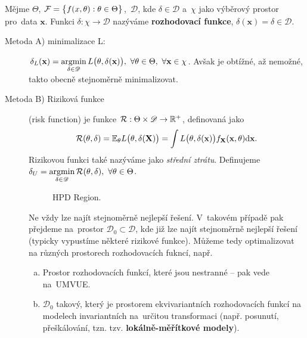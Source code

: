 \begin{define}
	Mějme $\Theta$, $\mathcal{F}=\big\{ f(x,\theta):\theta\in\Theta \big\}$,~$\mathscr{D}$, kde $\delta\in\mathscr{D}$ a~$\chi$ jako výběrový prostor pro~data $\textbf{x}$. Funkci $\delta:\chi\to\mathscr{D}$ nazýváme \textbf{rozhodovací funkce}, $\delta(\textbf{x})=\delta\in\mathscr{D}$. 
\end{define}
\begin{description}
	\item[Metoda A) minimalizace L:] $\delta_L(\textbf{x})=\mathop{\mathrm{argmin}}\limits_{\delta\in\mathscr{D}} L\big(\theta,\delta(\textbf{x})\big),~\forall \theta\in\Theta,~\forall\textbf{x}\in\chi$. Avšak je obtížné, až nemožné, takto obecně stejnoměrně minimalizovat.
	\item[Metoda B) Riziková funkce] (risk function) je funkce $\mathcal{R}:\Theta\times\mathscr{D}\to\mathbb{R}^+$, definovaná jako $$\mathcal{R}(\theta,\delta)=\mathbb{E}_\theta L\big(\theta,\delta(\textbf{X})\big)=\int L\big(\theta,\delta(\textbf{x})\big)f_\textbf{X}(\textbf{x},\theta)\mathrm{d}\textbf{x}.$$
	Rizikovou funkci také nazýváme jako \textit{střední ztrátu}. Definujeme $\delta_U=\mathop{\mathrm{argmin}}\limits_{\delta\in\mathscr{D}} \mathcal{R}(\theta,\delta),~\forall\theta\in\Theta$.
	
	\begin{figure}[h]
		\centering
		\caption{HPD Region.}
	\end{figure}
	
	Ne vždy lze najít stejnoměrně nejlepší řešení. V~takovém případě pak přejdeme na~prostor $\mathscr{D}_0\subset\mathscr{D}$, kde již lze najít stejnoměrně nejlepší řešení (typicky vypustíme některé rizikové funkce). Můžeme tedy optimalizovat na různých prostorech rozhodovacích fukncí, např.
	\begin{enumerate}[a)]
		\item  Prostor rozhodovacích funkcí, které jsou nestranné -- pak vede na~UMVUE.
		\item $\mathscr{D}_0$ takový, který je prostorem ekvivariantních rozhodovacích funkcí na modelech invariantních na~určitou transformaci (např. posunutí, přeškálování, tzn. tzv. \textbf{lokálně-měřítkové modely}).
	\end{enumerate}
	

\end{description}
